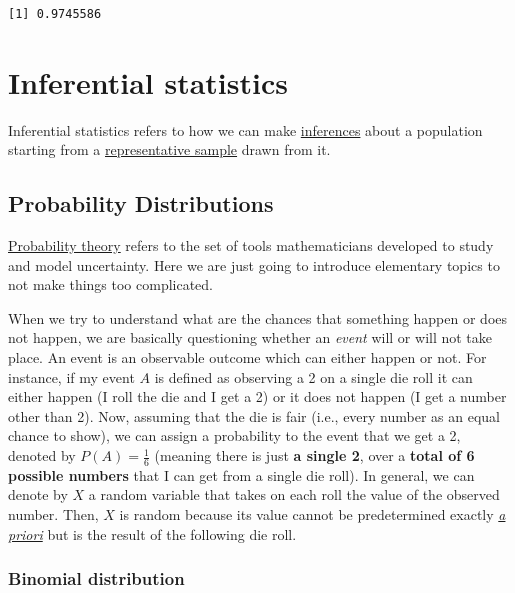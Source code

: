 \documentclass[
  letterpaper,
  DIV=11,
  numbers=noendperiod]{scrartcl}
\begin{document}
\begin{verbatim}
[1] 0.9745586
\end{verbatim}

\section{Inferential statistics}\label{inferential-statistics}

Inferential statistics refers to how we can make
\href{https://www.merriam-webster.com/dictionary/inference}{inferences}
about a population starting from a
\href{https://www.investopedia.com/terms/r/representative-sample.asp\#:~:text=A\%20representative\%20sample\%20is\%20a,three\%20males\%20and\%20three\%20females.}{representative
sample} drawn from it.

\subsection{Probability Distributions}\label{probability-distributions}

\href{https://en.wikipedia.org/wiki/Probability_theory}{Probability
theory} refers to the set of tools mathematicians developed to study and
model uncertainty. Here we are just going to introduce elementary topics
to not make things too complicated.

When we try to understand what are the chances that something happen or
does not happen, we are basically questioning whether an \emph{event}
will or will not take place. An event is an observable outcome which can
either happen or not. For instance, if my event \(A\) is defined as
observing a 2 on a single die roll it can either happen (I roll the die
and I get a 2) or it does not happen (I get a number other than 2). Now,
assuming that the die is fair (i.e., every number as an equal chance to
show), we can assign a probability to the event that we get a 2, denoted
by \(P(A) = \frac{1}{6}\) (meaning there is just \textbf{a single 2},
over a \textbf{total of 6 possible numbers} that I can get from a single
die roll). In general, we can denote by \(X\) a random variable that
takes on each roll the value of the observed number. Then, \(X\) is
random because its value cannot be predetermined exactly
\href{https://en.wikipedia.org/wiki/A_priori_and_a_posteriori}{\emph{a
priori}} but is the result of the following die roll.

\subsubsection{Binomial distribution}\label{binomial-distribution}
\end{document}
